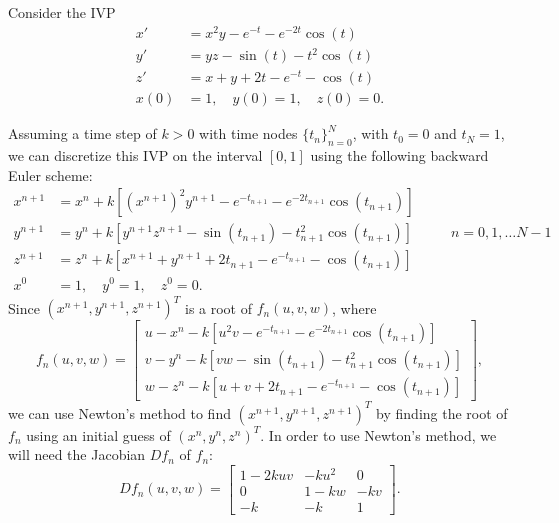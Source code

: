 \documentclass{homework}
\begin{document}
	\maketitle
	
	\question Consider the IVP
	\begin{equation}
		\begin{aligned}
			x' &= x^2y - e^{-t} - e^{-2t}\cos(t) \\
			y' &= yz - \sin(t) -t^2\cos(t) \\
			z' &= x + y + 2t - e^{-t} - \cos(t) \\
			x(0) &= 1, \quad y(0) = 1, \quad z(0) = 0.
		\end{aligned}
	\end{equation}
	
	\begin{alphaparts}
		\questionpart
		Assuming a time step of $k>0$ with time nodes $\{t_n\}_{n=0}^N$, with $t_0 = 0$ and $t_N = 1$, we can discretize this IVP on the interval $[0,1]$ using the following backward Euler scheme:
		\begin{equation}
			\begin{aligned}
				x^{n+1} &= x^n + k\left[\left(x^{n+1}\right)^2y^{n+1} - e^{-t_{n+1}} - e^{-2t_{n+1}}\cos(t_{n+1})\right] \\
				y^{n+1} &= y^n + k\left[y^{n+1}z^{n+1} - \sin(t_{n+1}) - t_{n+1}^2\cos(t_{n+1})\right] &&\quad n = 0, 1, \dots N-1 \\
				z^{n+1} &= z^n + k\left[x^{n+1} + y^{n+1} + 2t_{n+1} - e^{-t_{n+1}} - \cos(t_{n+1})\right] \\
				x^0 &= 1, \quad y^0 = 1, \quad z^0 = 0.
			\end{aligned}
		\end{equation}
		Since $\left(x^{n+1}, y^{n+1}, z^{n+1}\right)^T$ is a root of $f_n(u, v, w)$, where
		\begin{equation}
			f_n(u,v,w) = \left[\begin{matrix}
				u - x^n - k\left[u^2v - e^{-t_{n+1}} - e^{-2t_{n+1}}\cos(t_{n+1})\right] \\[0.5em]
				v - y^n - k\left[vw - \sin(t_{n+1}) - t_{n+1}^2\cos(t_{n+1})\right] \\[0.5em]
				w - z^n - k\left[u + v + 2t_{n+1} - e^{-t_{n+1}}-\cos(t_{n+1})\right]
			\end{matrix}\right],
		\end{equation}
		we can use Newton's method to find $\left(x^{n+1},y^{n+1}, z^{n+1}\right)^T$ by finding the root of $f_n$ using an initial guess of $\left(x^n, y^n, z^n\right)^T$. In order to use Newton's method, we will need the Jacobian $Df_n$ of $f_n$:
		\begin{equation}
			Df_n(u,v,w) = \left[\begin{matrix}
				1 - 2kuv & -ku^2 & 0 \\
				0 & 1 - kw & -kv \\
				-k & -k & 1
			\end{matrix}\right].
		\end{equation}
		

\end{alphaparts}
\end{document}
